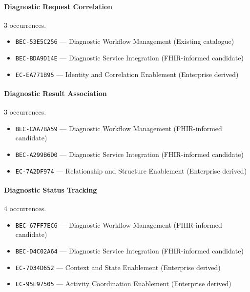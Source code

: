 \documentclass[11pt,a4paper,openany]{book}
\begin{document}
\paragraph{Diagnostic Request Correlation} 3 occurrences.\par
\begin{itemize}
\item \texttt{BEC-53E5C256} --- Diagnostic Workflow Management (Existing catalogue)
\item \texttt{BEC-BDA9D14E} --- Diagnostic Service Integration (FHIR-informed candidate)
\item \texttt{EC-EA771B95} --- Identity and Correlation Enablement (Enterprise derived)
\end{itemize}
\paragraph{Diagnostic Result Association} 3 occurrences.\par
\begin{itemize}
\item \texttt{BEC-CAA7BA59} --- Diagnostic Workflow Management (FHIR-informed candidate)
\item \texttt{BEC-A299B6D0} --- Diagnostic Service Integration (FHIR-informed candidate)
\item \texttt{EC-7A2DF974} --- Relationship and Structure Enablement (Enterprise derived)
\end{itemize}
\paragraph{Diagnostic Status Tracking} 4 occurrences.\par
\begin{itemize}
\item \texttt{BEC-67FF7EC6} --- Diagnostic Workflow Management (FHIR-informed candidate)
\item \texttt{BEC-D4C02A64} --- Diagnostic Service Integration (FHIR-informed candidate)
\item \texttt{EC-7D34D652} --- Context and State Enablement (Enterprise derived)
\item \texttt{EC-95E97505} --- Activity Coordination Enablement (Enterprise derived)
\end{itemize}
\end{document}
